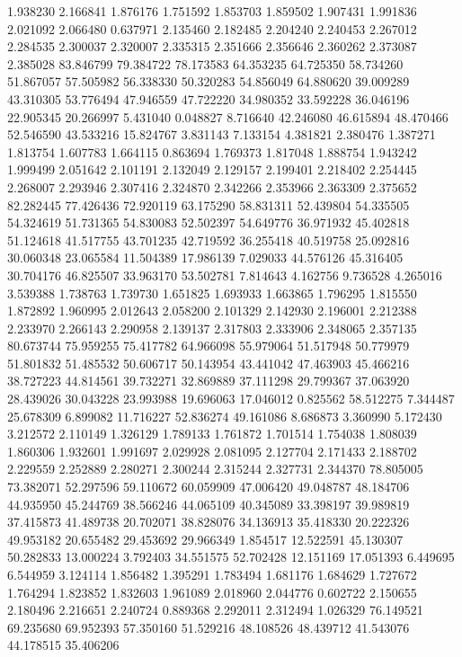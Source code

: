 1.938230
2.166841
1.876176
1.751592
1.853703
1.859502
1.907431
1.991836
2.021092
2.066480
0.637971
2.135460
2.182485
2.204240
2.240453
2.267012
2.284535
2.300037
2.320007
2.335315
2.351666
2.356646
2.360262
2.373087
2.385028
83.846799
79.384722
78.173583
64.353235
64.725350
58.734260
51.867057
57.505982
56.338330
50.320283
54.856049
64.880620
39.009289
43.310305
53.776494
47.946559
47.722220
34.980352
33.592228
36.046196
22.905345
20.266997
5.431040
0.048827
8.716640
42.246080
46.615894
48.470466
52.546590
43.533216
15.824767
3.831143
7.133154
4.381821
2.380476
1.387271
1.813754
1.607783
1.664115
0.863694
1.769373
1.817048
1.888754
1.943242
1.999499
2.051642
2.101191
2.132049
2.129157
2.199401
2.218402
2.254445
2.268007
2.293946
2.307416
2.324870
2.342266
2.353966
2.363309
2.375652
82.282445
77.426436
72.920119
63.175290
58.831311
52.439804
54.335505
54.324619
51.731365
54.830083
52.502397
54.649776
36.971932
45.402818
51.124618
41.517755
43.701235
42.719592
36.255418
40.519758
25.092816
30.060348
23.065584
11.504389
17.986139
7.029033
44.576126
45.316405
30.704176
46.825507
33.963170
53.502781
7.814643
4.162756
9.736528
4.265016
3.539388
1.738763
1.739730
1.651825
1.693933
1.663865
1.796295
1.815550
1.872892
1.960995
2.012643
2.058200
2.101329
2.142930
2.196001
2.212388
2.233970
2.266143
2.290958
2.139137
2.317803
2.333906
2.348065
2.357135
80.673744
75.959255
75.417782
64.966098
55.979064
51.517948
50.779979
51.801832
51.485532
50.606717
50.143954
43.441042
47.463903
45.466216
38.727223
44.814561
39.732271
32.869889
37.111298
29.799367
37.063920
28.439026
30.043228
23.993988
19.696063
17.046012
0.825562
58.512275
7.344487
25.678309
6.899082
11.716227
52.836274
49.161086
8.686873
3.360990
5.172430
3.212572
2.110149
1.326129
1.789133
1.761872
1.701514
1.754038
1.808039
1.860306
1.932601
1.991697
2.029928
2.081095
2.127704
2.171433
2.188702
2.229559
2.252889
2.280271
2.300244
2.315244
2.327731
2.344370
78.805005
73.382071
52.297596
59.110672
60.059909
47.006420
49.048787
48.184706
44.935950
45.244769
38.566246
44.065109
40.345089
33.398197
39.989819
37.415873
41.489738
20.702071
38.828076
34.136913
35.418330
20.222326
49.953182
20.655482
29.453692
29.966349
1.854517
12.522591
45.130307
50.282833
13.000224
3.792403
34.551575
52.702428
12.151169
17.051393
6.449695
6.544959
3.124114
1.856482
1.395291
1.783494
1.681176
1.684629
1.727672
1.764294
1.823852
1.832603
1.961089
2.018960
2.044776
0.602722
2.150655
2.180496
2.216651
2.240724
0.889368
2.292011
2.312494
1.026329
76.149521
69.235680
69.952393
57.350160
51.529216
48.108526
48.439712
41.543076
44.178515
35.406206
